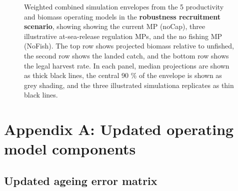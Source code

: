 \documentclass[11pt]{book}
\begin{document}
\begin{landscape}
\begin{figure}[htb]
{\centering {} 

}

\caption{Weighted combined simulation envelopes from the 5 productivity and biomass operating models in the \textbf{robustness recruitment scenario}, showing showing the current MP (noCap), three illustrative at-sea-release regulation MPs, and the no fishing MP (NoFish). The top row shows projected biomass relative to unfished, the second row shows the landed catch, and the bottom row shows the legal harvest rate. In each panel, median projections are shown as thick black lines, the central 90 \% of the envelope is shown as grey shading, and the three illustrated simulationa replicates as thin black lines.}\label{fig:unnamed-chunk-26}
\end{figure}
\end{landscape}
\hypertarget{appendix-appendices}{%
\appendix}


\hypertarget{appendix-a-updated-operating-model-components}{%
\section{Appendix A: Updated operating model components}\label{appendix-a-updated-operating-model-components}}

\setcounter{table}{0}\setcounter{figure}{0}

\hypertarget{updated-ageing-error-matrix}{%
\subsection{Updated ageing error matrix}\label{updated-ageing-error-matrix}}
\end{document}
